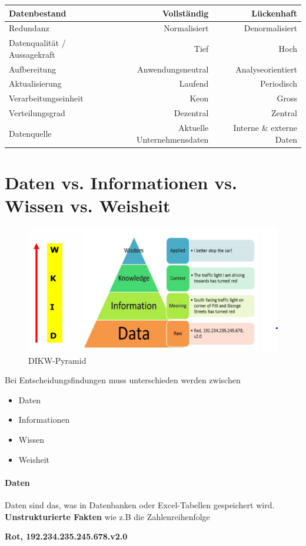 \documentclass[a4paper, 11pt]{article}
\begin{document}
\begin{tabular}{|l|r|r|}
	\hline
	Datenbestand & Vollständig & Lückenhaft \\
	\hline
	Redundanz & Normalisiert & Denormalisiert \\
	\hline
	Datenqualität / Aussagekraft & Tief & Hoch \\
	\hline
	Aufbereitung & Anwendungsneutral & Analyseorientiert \\
	\hline
	Aktualisierung & Laufend & Periodisch \\
	\hline
	Verarbeitungseinheit & Keon & Gross \\
	\hline
	Verteilungsgrad & Dezentral & Zentral \\
	\hline
	Datenquelle & Aktuelle Unternehmensdaten & Interne \& externe Daten \\
\end{tabular} 

\newpage

\section{Daten vs. Informationen vs. Wissen vs. Weisheit}

\begin{figure}[htb]
	\centering
	\includegraphics[keepaspectratio=true,height=18\baselineskip]{DIWW.PNG}
	\caption{DIKW-Pyramid}
	\label{fig:dikw}
\end{figure}

Bei Entscheidungsfindungen muss unterschieden werden zwischen

\begin{itemize}
	\item Daten
	\item Informationen
	\item Wissen
	\item Weisheit
\end{itemize}

\paragraph{Daten}
Daten sind das, was in Datenbanken oder Excel-Tabellen gespeichert wird. \textbf{Unstrukturierte Fakten} wie z.B die Zahlenreihenfolge 
\begin{center}
\textbf{	Rot, 192.234.235.245.678.v2.0}
\end{center}
\end{document}
